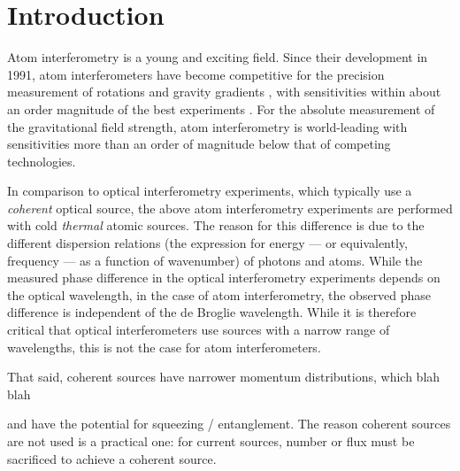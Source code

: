 \chapter{Introduction}
\label{Introduction}
\graphicspath{{Figures/Introduction/}{Figures/Common/}}


Atom interferometry is a young and exciting field.  Since their development in 1991, atom interferometers have become competitive for the precision measurement of rotations \citep{McGuirk:2002} and gravity gradients \citep{Gustavson:2000}, with sensitivities within about an order magnitude of the best experiments \citep{Schreiber:2008,Moody:1993,Kann:1994}.  For the absolute measurement of the gravitational field strength, atom interferometry is world-leading \citep{Muller:2008} with sensitivities more than an order of magnitude below that of competing technologies.

In comparison to optical interferometry experiments, which typically use a \emph{coherent} optical source, the above atom interferometry experiments are performed with cold \emph{thermal} atomic sources.  The reason for this difference is due to the different dispersion relations (the expression for energy --- or equivalently, frequency --- as a function of wavenumber) of photons and atoms.  While the measured phase difference in the optical interferometry experiments depends on the optical wavelength, in the case of atom interferometry, the observed phase difference is independent of the de Broglie wavelength.  While it is therefore critical that optical interferometers use sources with a narrow range of wavelengths, this is not the case for atom interferometers.





That said, coherent sources have narrower momentum distributions, which blah blah

and have the potential for squeezing / entanglement.  The reason coherent sources are not used is a practical one: for current sources, number or flux must be sacrificed to achieve a coherent source.

